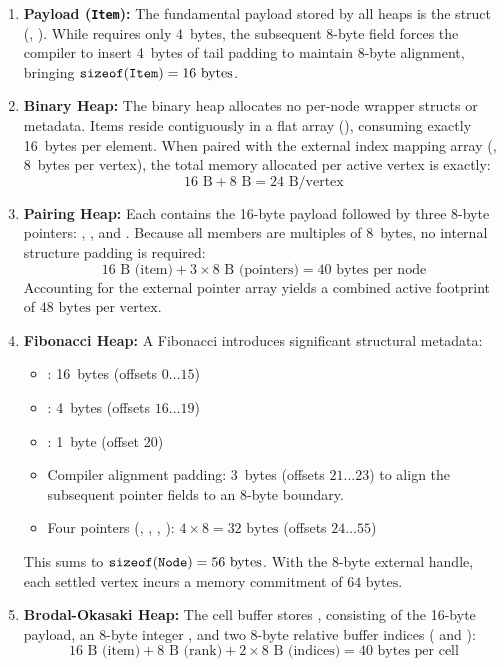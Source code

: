 \begin{enumerate}
  \item \textbf{Payload (\texttt{Item}):} 
  The fundamental payload stored by all heaps is the  struct (, ). While  requires only 4~bytes, the subsequent 8-byte  field forces the compiler to insert 4~bytes of tail padding to maintain 8-byte alignment, bringing $\texttt{sizeof}(\code{Item}) = 16\text{ bytes}$.

  \item \textbf{Binary Heap:} 
  The binary heap allocates no per-node wrapper structs or metadata. Items reside contiguously in a flat array (), consuming exactly 16~bytes per element. When paired with the external index mapping array (, 8~bytes per vertex), the total memory allocated per active vertex is exactly:
  \[
    16\text{ B} + 8\text{ B} = 24\text{ B/vertex}
  \]

  \item \textbf{Pairing Heap:} 
  Each  contains the 16-byte  payload followed by three 8-byte pointers: , , and . Because all members are multiples of 8~bytes, no internal structure padding is required:
  \[
    16\text{ B (item)} + 3 \times 8\text{ B (pointers)} = 40\text{ bytes per node}
  \]
  Accounting for the external  pointer array yields a combined active footprint of $48\text{ bytes per vertex}$.

  \item \textbf{Fibonacci Heap:} 
  A Fibonacci  introduces significant structural metadata:
  \begin{itemize}
    \item {}: 16~bytes (offsets $0 \dots 15$)
    \item {}: 4~bytes (offsets $16 \dots 19$)
    \item {}: 1~byte (offset $20$)
    \item Compiler alignment padding: 3~bytes (offsets $21 \dots 23$) to align the subsequent pointer fields to an 8-byte boundary.
    \item Four pointers (, , , ): $4 \times 8 = 32\text{ bytes}$ (offsets $24 \dots 55$)
  \end{itemize}
  This sums to $\texttt{sizeof}(\code{Node}) = 56\text{ bytes}$. With the 8-byte external  handle, each settled vertex incurs a memory commitment of $64\text{ bytes}$.

  \item \textbf{Brodal-Okasaki Heap:} 
  The cell buffer stores , consisting of the 16-byte payload, an 8-byte integer , and two 8-byte relative buffer indices ( and ):
  \[
    16\text{ B (item)} + 8\text{ B (rank)} + 2 \times 8\text{ B (indices)} = 40\text{ bytes per cell}
  \]
\end{enumerate}

